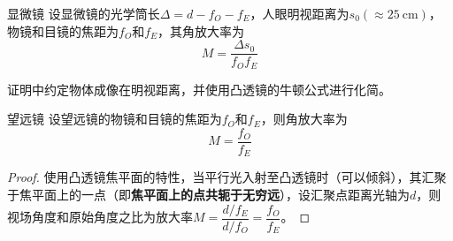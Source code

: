\begin{myprop}{ 显微镜}{}
	设显微镜的光学筒长$\Delta=d-f_{O}-f_{E}$，人眼明视距离为$s_{0}(\approx \SI{25}{\cm})$，物镜和目镜的焦距为$f_{O}$和$f_{E}$，其角放大率为
    \[
        M=\dfrac{\Delta s_0}{f_{O}f_{E}}
    \]
\end{myprop}
证明中约定物体成像在明视距离，并使用凸透镜的牛顿公式进行化简。


\begin{myprop}{ 望远镜}{}
    设望远镜的物镜和目镜的焦距为$f_{O}$和$f_{E}
    $，则角放大率为
    \[
        M=\dfrac{f_{O}}{f_{E}}    
    \]
\end{myprop}
\begin{proof}
    使用凸透镜焦平面的特性，当平行光入射至凸透镜时（可以倾斜），其汇聚于焦平面上的一点（即\textbf{焦平面上的点共轭于无穷远}），设汇聚点距离光轴为$d$，则视场角度和原始角度之比为放大率$M=\dfrac{d/f_{E}}{d/f_{O}}=\dfrac{f_{O}}{f_{E}}$。
\end{proof}

